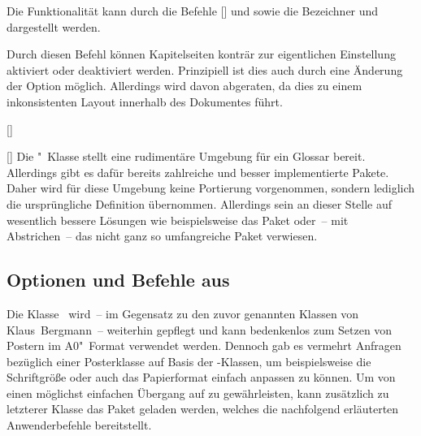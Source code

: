 \begin{Bundle*}{}
\begin{Declaration}{}
\printdeclarationlist%
%
Die Funktionalität kann durch die Befehle [] 
und  sowie die Bezeichner  und 
 dargestellt werden.
\end{Declaration}

\begin{Declaration}{}
\printdeclarationlist%
%
Durch diesen Befehl können Kapitelseiten konträr zur eigentlichen Einstellung 
aktiviert oder deaktiviert werden. Prinzipiell ist dies auch durch eine 
Änderung der Option  möglich. Allerdings wird davon 
abgeraten, da dies zu einem inkonsistenten Layout innerhalb des Dokumentes 
führt.
\end{Declaration}

\begin{Declaration}{[]}
\begin{Declaration}{[]}
\printdeclarationlist%
%
Die "~Klasse stellt eine rudimentäre Umgebung für ein Glossar 
bereit. Allerdings gibt es dafür bereits zahlreiche und besser implementierte 
Pakete. Daher wird für diese Umgebung keine Portierung vorgenommen, sondern 
lediglich die ursprüngliche Definition übernommen. Allerdings sein an dieser 
Stelle auf wesentlich bessere Lösungen wie beispielsweise das Paket 
 oder~-- mit Abstrichen~-- das nicht ganz so umfangreiche 
Paket  verwiesen.
\end{Declaration}
\end{Declaration}
%

\subsection{Optionen und Befehle aus }
%
%
Die Klasse~ wird~-- im Gegensatz zu den zuvor genannten 
Klassen von Klaus~Bergmann~-- weiterhin gepflegt und kann bedenkenlos zum 
Setzen von Postern im A0"~Format verwendet werden. Dennoch gab es vermehrt 
Anfragen bezüglich einer Posterklasse auf Basis der \TUDScript-Klassen, um 
beispielsweise die Schriftgröße oder auch das Papierformat einfach anpassen zu 
können. Um von  einen möglichst einfachen Übergang auf 
 zu gewährleisten, kann zusätzlich zu letzterer Klasse das 
Paket  geladen werden, welches die nachfolgend erläuterten 
Anwenderbefehle bereitstellt.


\end{Bundle*}
